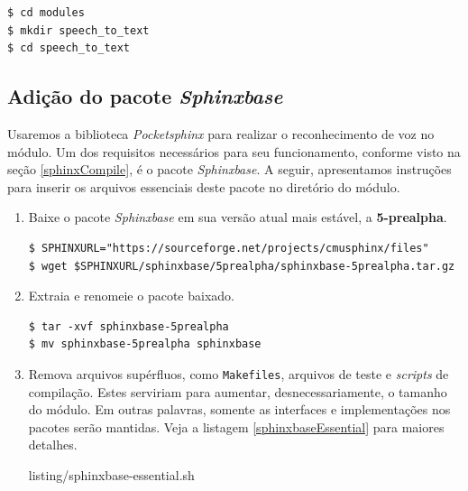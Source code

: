 \begin{lstlisting}[language=Bash]
$ cd modules
$ mkdir speech_to_text
$ cd speech_to_text
\end{lstlisting}


\subsection{Adição do pacote \textit{Sphinxbase}}

Usaremos a biblioteca \textit{Pocketsphinx} para realizar o reconhecimento de voz no módulo. Um dos requisitos necessários para seu funcionamento, conforme visto na seção \ref{sphinxCompile}, é o pacote \textit{Sphinxbase}. A seguir, apresentamos instruções para inserir os arquivos essenciais deste pacote no diretório do módulo.

\begin{enumerate}
\item Baixe o pacote \textit{Sphinxbase} em sua versão atual mais estável, a \textbf{5-prealpha}.

\begin{lstlisting}
$ SPHINXURL="https://sourceforge.net/projects/cmusphinx/files"
$ wget $SPHINXURL/sphinxbase/5prealpha/sphinxbase-5prealpha.tar.gz
\end{lstlisting}

\item Extraia e renomeie o pacote baixado.

\begin{lstlisting}
$ tar -xvf sphinxbase-5prealpha
$ mv sphinxbase-5prealpha sphinxbase
\end{lstlisting}

\item Remova arquivos supérfluos, como \texttt{Makefiles}, arquivos de teste e \textit{scripts} de compilação. Estes serviriam para aumentar, desnecessariamente, o tamanho do módulo. Em outras palavras, somente as interfaces e implementações nos pacotes serão mantidas. Veja a listagem \ref{sphinxbaseEssential} para maiores detalhes.


  {listing/sphinxbase-essential.sh}
\end{enumerate}


